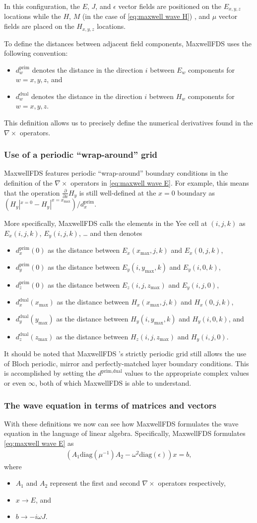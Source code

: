 \documentclass{article}
\newcommand{\E}[2]{\begin{align}#2\label{eq:#1}\end{align}}
\newcommand{\curl}{\nabla\times}
\newcommand{\eq}[1]{\eqref{eq:#1}}
\newcommand{\MaxwellFDS}{MaxwellFDS }
\newcommand{\BI}{\begin{itemize}\item}
\newcommand{\EI}{\end{itemize}}
\newcommand{\I}{\item}
\newcommand{\pf}[1]{\frac{\partial}{\partial #1}} %
\newcommand{\prim}{\text{prim}}
\newcommand{\dual}{\text{dual}}
\newcommand{\mx}{\text{max}}
\newcommand{\diag}{\text{diag}}
\begin{document}
In this configuration, the $E$, $J$, and $\epsilon$ vector fields
    are positioned on the $E_{x,y,z}$ locations 
    while the $H$, $M$ (in the case of \eq{maxwell wave H}) , and $\mu$
    vector fields are placed on the $H_{x,y,z}$ locations.

To define the distances between adjacent field components,
    \MaxwellFDS uses the following convention:
    \BI $d^\prim_{w}$ denotes the distance in the direction $i$
        between $E_w$ components for $w = x, y, z$, and
    \I  $d^\dual_{w}$ denotes the distance in the direction $i$
        between $H_w$ components for $w = x, y, z$. \EI
This definition allows us to precisely define the numerical derivatives
    found in the $\curl$ operators.
    
\subsubsection{Use of a periodic ``wrap-around'' grid}
\MaxwellFDS features periodic ``wrap-around'' boundary conditions
    in the definition of the $\curl$ operators in \eq{maxwell wave E}.
For example, this means that the operation $\pf{x}H_y$ is still well-defined
    at the $x=0$ boundary as 
    $(H_y|^{x=0} - H_y|^{x = x_\mx}) / d^\prim_x$.

More specifically, \MaxwellFDS calls the elements 
    in the Yee cell at $(i,j,k)$ as $E_x(i,j,k)$, $E_y(i,j,k)$, \ldots 
    and then denotes 
\BI $d^\prim_x(0)$ as the distance 
    between $E_x(x_\mx,j,k)$ and $E_x(0,j,k)$,
\I  $d^\prim_y(0)$ as the distance 
    between $E_y(i,y_\mx,k)$ and $E_y(i,0,k)$,
\I  $d^\prim_z(0)$ as the distance 
    between $E_z(i,j,z_\mx)$ and $E_y(i,j,0)$,
\I  $d^\dual_x(x_\mx)$ as the distance 
    between $H_x(x_\mx,j,k)$ and $H_x(0,j,k)$,
\I  $d^\dual_y(y_\mx)$ as the distance 
    between $H_y(i,y_\mx,k)$ and $H_y(i,0,k)$, and
\I  $d^\dual_z(z_\mx)$ as the distance 
    between $H_z(i,j,z_\mx)$ and $H_y(i,j,0)$. \EI

It should be noted that \MaxwellFDS's strictly periodic grid still
    allows the use of Bloch periodic, mirror and perfectly-matched layer
    boundary conditions.
This is accomplished by setting the $d^{\prim,\dual}$ values to 
    the appropriate complex values or even $\infty$,
    both of which \MaxwellFDS is able to understand.
    
\subsubsection{The wave equation in terms of matrices and vectors}
With these definitions we now can see how \MaxwellFDS
    formulates the wave equation in the language of linear algebra.
Specifically, \MaxwellFDS formulates \eq{maxwell wave E} as
\E  {maxwell wave E discretized}
    {(A_1 \diag(\mu^{-1}) A_2 - \omega^2 \diag(\epsilon)) x = b,}
    where
    \BI $A_1$ and $A_2$ represent the first and second $\curl$ operators
        respectively,
    \I  $x \to E$, and
    \I  $b \to -i \omega J$. \EI
\end{document}
